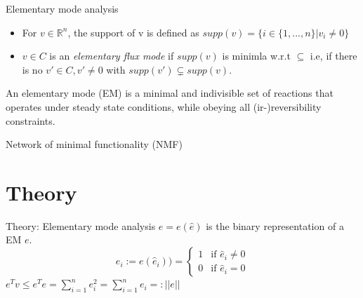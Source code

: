 \documentclass{beamer}
\begin{document}
\begin{frame}{Elementary mode analysis}
    \begin{itemize}
        \item For $v \in \mathbb{R}^n$, the support of v is defined as 
        $supp(v) = \{i \in \{1, ..., n \} | v_i \neq 0  \}$
    
        \item $v \in C$ is an \emph{elementary flux mode} if $supp(v)$
        is minimla w.r.t $\subseteq$
        i.e, if there is no $v' \in C, v' \neq 0$ with 
        $supp(v') \subsetneq supp(v)$.
    \end{itemize}
    
    
    \begin{definition}
        An elementary mode (EM) is a minimal and indivisible set 
        of reactions that operates under steady state conditions, 
        while obeying all (ir-)reversibility constraints.
    \end{definition}
    
\end{frame}

\begin{frame}{Network of minimal functionality (NMF)}
    
\end{frame}


\section{Theory}
\begin{frame}{Theory: Elementary mode analysis}
    $e = e(\hat{e}) $ is the binary representation of a EM $e$.
    \begin{equation}
        e_{i} := e(\hat{e}_{i})) = 
        \begin{cases}
            1 & \text{if }  \hat{e}_{i} \neq 0 \\
            0 & \text{if }  \hat{e}_{i} = 0 
        \end{cases}
    \end{equation}
    $ e^{T}v \leq e^{T}e = \sum_{i=1}^{n} e_{i}^{2} = \sum_{i=1}^{n} e_{i} =: ||e||$

\end{frame}
\end{document}
